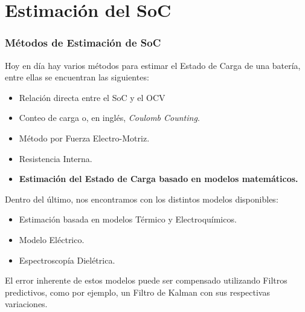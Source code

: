 \documentclass[10pt]{beamer}
\theoremstyle{remark}
\theoremstyle{definition}
\begin{document}
\section{Estimación del SoC}

\begin{frame}[allowframebreaks]
	\frametitle{Métodos de Estimación de SoC}
  	Hoy en día hay varios métodos para estimar el Estado de Carga de una batería,
  	entre ellas se encuentran las siguientes:
  	\begin{itemize}
		\item 	Relación directa entre el SoC y el OCV
		\item 	Conteo de carga o, en inglés, \emph{Coulomb Counting}.
		\item 	Método por Fuerza Electro-Motriz.
		\item 	Resistencia Interna.
		\item 	\textbf{Estimación del Estado de Carga basado en modelos matemáticos.}
  	\end{itemize}
	\framebreak
  	Dentro del último, nos encontramos con los distintos modelos disponibles:
  	\begin{itemize}
		\item	Estimación basada en modelos Térmico y Electroquímicos.
		\item	Modelo Eléctrico.
		\item 	Espectroscopía Dielétrica.
  	\end{itemize}
  	El error inherente de estos modelos puede ser compensado utilizando Filtros
  	predictivos, como por ejemplo, un Filtro de Kalman con sus respectivas
  	variaciones.
\end{frame}
\end{document}
